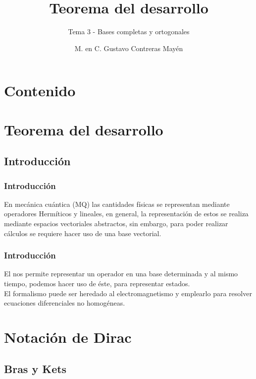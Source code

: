 \documentclass[12pt]{beamer}
\date{}
\title{\large{Teorema del desarrollo}}
\subtitle{Tema 3 - Bases completas y ortogonales}
\author{M. en C. Gustavo Contreras Mayén}
\begin{document}
\maketitle
\fontsize{14}{14}\selectfont
{}

\section*{Contenido}

\section{Teorema del desarrollo}
\subsection{Introducción}

\begin{frame}
\frametitle{Introducción}
En mecánica cuántica (MQ) las cantidades físicas se representan mediante operadores Hermíticos y lineales, en general, \pause la representación de estos se realiza mediante espacios vectoriales abstractos, sin embargo, para poder realizar cálculos se requiere hacer uso de una base vectorial.
\end{frame}
\begin{frame}
\frametitle{Introducción}
El  nos permite representar un operador en una base determinada \pause y al mismo tiempo, podemos hacer uso de éste, para representar estados.
\\
\bigskip
\pause
El formalismo puede ser heredado al electromagnetismo y emplearlo para resolver ecuaciones diferenciales no homogéneas.
\end{frame}

\section{Notación de Dirac}
\subsection{Bras y Kets}
\end{document}
